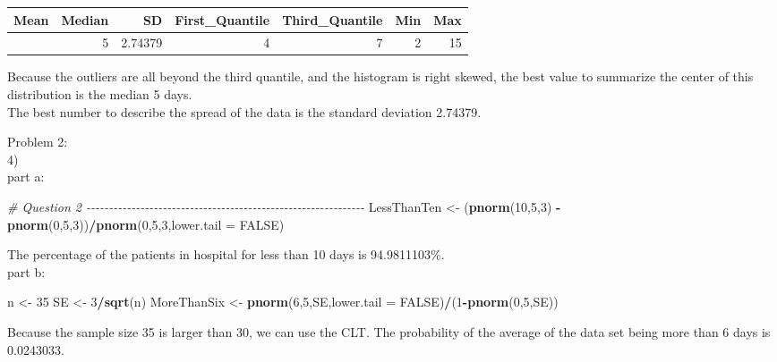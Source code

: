 \documentclass[
]{article}
\newenvironment{Shaded}{\begin{snugshade}}{\end{snugshade}}
\newcommand{\AttributeTok}[1]{\textcolor[rgb]{0.13,0.29,0.53}{#1}}
\newcommand{\CommentTok}[1]{\textcolor[rgb]{0.56,0.35,0.01}{\textit{#1}}}
\newcommand{\ConstantTok}[1]{\textcolor[rgb]{0.56,0.35,0.01}{#1}}
\newcommand{\DecValTok}[1]{\textcolor[rgb]{0.00,0.00,0.81}{#1}}
\newcommand{\FunctionTok}[1]{\textcolor[rgb]{0.13,0.29,0.53}{\textbf{#1}}}
\newcommand{\NormalTok}[1]{#1}
\newcommand{\OtherTok}[1]{\textcolor[rgb]{0.56,0.35,0.01}{#1}}
\newcommand{\SpecialCharTok}[1]{\textcolor[rgb]{0.81,0.36,0.00}{\textbf{#1}}}
\begin{document}
\begin{longtable}[]{@{}rrrrrrr@{}}
\toprule\noalign{}
Mean & Median & SD & First\_Quantile & Third\_Quantile & Min & Max \\
\midrule\noalign{}
\endhead
\bottomrule\noalign{}
\endlastfoot
5.63 & 5 & 2.74379 & 4 & 7 & 2 & 15 \\
\end{longtable}

Because the outliers are all beyond the third quantile, and the
histogram is right skewed, the best value to summarize the center of
this distribution is the median 5 days.\\

The best number to describe the spread of the data is the standard
deviation 2.74379.

Problem 2:\\
4)\\
part a:\\

\begin{Shaded}
\begin{Highlighting}[]
\CommentTok{\# Question 2 {-}{-}{-}{-}{-}{-}{-}{-}{-}{-}{-}{-}{-}{-}{-}{-}{-}{-}{-}{-}{-}{-}{-}{-}{-}{-}{-}{-}{-}{-}{-}{-}{-}{-}{-}{-}{-}{-}{-}{-}{-}{-}{-}{-}{-}{-}{-}{-}{-}{-}{-}{-}{-}{-}{-}{-}{-}{-}{-}{-}{-}{-}}
\NormalTok{LessThanTen }\OtherTok{\textless{}{-}}\NormalTok{ (}\FunctionTok{pnorm}\NormalTok{(}\DecValTok{10}\NormalTok{,}\DecValTok{5}\NormalTok{,}\DecValTok{3}\NormalTok{) }\SpecialCharTok{{-}} \FunctionTok{pnorm}\NormalTok{(}\DecValTok{0}\NormalTok{,}\DecValTok{5}\NormalTok{,}\DecValTok{3}\NormalTok{))}\SpecialCharTok{/}\FunctionTok{pnorm}\NormalTok{(}\DecValTok{0}\NormalTok{,}\DecValTok{5}\NormalTok{,}\DecValTok{3}\NormalTok{,}\AttributeTok{lower.tail =} \ConstantTok{FALSE}\NormalTok{)}
\end{Highlighting}
\end{Shaded}

The percentage of the patients in hospital for less than 10 days is
94.9811103\%.\\

part b:\\

\begin{Shaded}
\begin{Highlighting}[]
\NormalTok{n }\OtherTok{\textless{}{-}} \DecValTok{35}
\NormalTok{SE }\OtherTok{\textless{}{-}} \DecValTok{3}\SpecialCharTok{/}\FunctionTok{sqrt}\NormalTok{(n)}
\NormalTok{MoreThanSix }\OtherTok{\textless{}{-}} \FunctionTok{pnorm}\NormalTok{(}\DecValTok{6}\NormalTok{,}\DecValTok{5}\NormalTok{,SE,}\AttributeTok{lower.tail =} \ConstantTok{FALSE}\NormalTok{)}\SpecialCharTok{/}\NormalTok{(}\DecValTok{1}\SpecialCharTok{{-}}\FunctionTok{pnorm}\NormalTok{(}\DecValTok{0}\NormalTok{,}\DecValTok{5}\NormalTok{,SE))}
\end{Highlighting}
\end{Shaded}

Because the sample size 35 is larger than 30, we can use the CLT. The
probability of the average of the data set being more than 6 days is
0.0243033.
\end{document}
